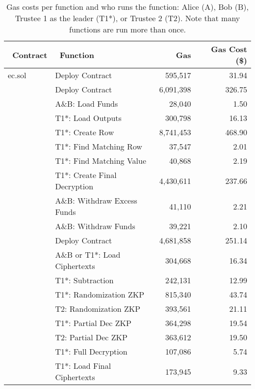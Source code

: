 \begin{table}[t]
		\centering
	\begin{tabular}{|l|l|r|r|}
		\hline
		~\textbf{Contract} & ~\textbf{Function } & ~\textbf{Gas}  & ~\textbf{Gas Cost (\$)}  \\ \hline
			ec.sol	& Deploy Contract &595,517 & 31.94 \\ \hline

		\multirow{8}{*}{}  
		& Deploy Contract &6,091,398 & 326.75 \\ \cline{2-4} 
		& A\&B: Load Funds & 28,040  &1.50  \\ \cline{2-4} 
		& T1*: Load Outputs&  300,798 & 16.13 \\  \cline{2-4} 
		& T1*: Create Row & 8,741,453 & 468.90 \\  \cline{2-4}
		Mixmatch.sol 	& T1*: Find Matching Row & 37,547 &2.01  \\  \cline{2-4}
		(Absentia DApp)& T1*: Find Matching Value &  40,868&2.19 \\  \cline{2-4}
		& T1*:  Create Final Decryption&  4,430,611& 237.66 \\  \cline{2-4}
		& A\&B: Withdraw Excess Funds &  41,110& 2.21 \\  \cline{2-4}
		&  A\&B:  Withdraw Funds&  39,221& 2.10 \\   \hline
		\multirow{8}{*}{} 
		& Deploy Contract & 4,681,858&251.14 \\ \cline{2-4} 
		&   A\&B or T1*: Load Ciphertexts & 304,668 & 16.34 \\  \cline{2-4}
		& T1*: Subtraction & 242,131 & 12.99\\  \cline{2-4}
		& T1*: Randomization ZKP& 815,340 &  43.74\\  \cline{2-4}
		PET.sol	&  T2: Randomization ZKP& 393,561 &21.11  \\  \cline{2-4}
		(PET Sub-DApp) & T1*: Partial Dec ZKP& 364,298 & 19.54\\  \cline{2-4}
		& T2: Partial Dec ZKP & 363,612 & 19.50 \\  \cline{2-4}
		& T1*: Full Decryption  &  107,086& 5.74 \\  \cline{2-4}
		& T1*:  Load Final Ciphertexts& 173,945 & 9.33\\ \hline
		\cline{1-4}
	\end{tabular}
	\caption{Gas costs per function and who runs the function: Alice (A), Bob (B), Trustee 1 as the leader (T1*), or Trustee 2 (T2). Note that many functions are run more than once.}
	 \label{tab:gascost}
\end{table}